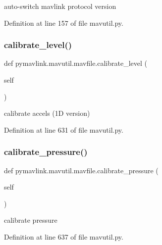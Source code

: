\begin{DoxyVerb}auto-switch mavlink protocol version\end{DoxyVerb}
 

Definition at line 157 of file mavutil.\+py.

\mbox{\label{classpymavlink_1_1mavutil_1_1mavfile_a56b77586434e96ca161d4744104fe313}} 
\subsubsection{\texorpdfstring{calibrate\_level()}{calibrate\_level()}}
{\footnotesize\ttfamily def pymavlink.\+mavutil.\+mavfile.\+calibrate\+\_\+level (\begin{DoxyParamCaption}\item[{}]{self }\end{DoxyParamCaption})}

\begin{DoxyVerb}calibrate accels (1D version)\end{DoxyVerb}
 

Definition at line 631 of file mavutil.\+py.

\mbox{\label{classpymavlink_1_1mavutil_1_1mavfile_af0001f7ae0e3d0e63c592f3ad98740d6}} 
\subsubsection{\texorpdfstring{calibrate\_pressure()}{calibrate\_pressure()}}
{\footnotesize\ttfamily def pymavlink.\+mavutil.\+mavfile.\+calibrate\+\_\+pressure (\begin{DoxyParamCaption}\item[{}]{self }\end{DoxyParamCaption})}

\begin{DoxyVerb}calibrate pressure\end{DoxyVerb}
 

Definition at line 637 of file mavutil.\+py.

